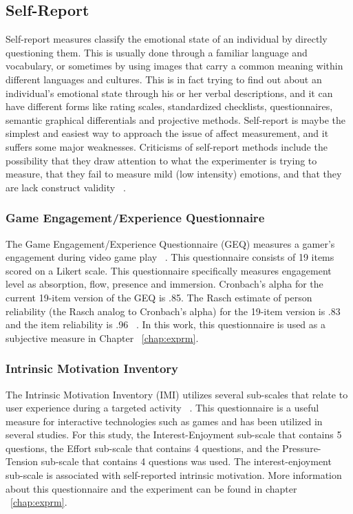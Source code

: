 \subsection{Self-Report}
Self-report measures classify the emotional state of an individual by directly questioning them. This is usually done through a familiar language and vocabulary, or sometimes by using images that carry a common meaning within different languages and cultures. This is in fact trying to find out about an individual's emotional state through his or her verbal descriptions, and it can have different forms like rating scales, standardized checklists, questionnaires, semantic graphical differentials and projective methods. Self-report is maybe the simplest and easiest way to approach the issue of affect measurement, and it suffers some major weaknesses. Criticisms of self-report methods include the possibility that they draw attention to what the experimenter is trying to measure, that they fail to measure mild (low intensity) emotions, and that they are lack construct validity ~\cite{isen2007some}.

\subsubsection{Game Engagement/Experience Questionnaire}
The Game Engagement/Experience Questionnaire (GEQ) measures a gamer's engagement during video game play ~\cite{brockmyer2009development}. This questionnaire consists of 19 items scored on a Likert scale. This questionnaire specifically measures engagement level as absorption, flow, presence and immersion. Cronbach's alpha for the current 19-item version of the GEQ is .85. The Rasch estimate of person reliability (the Rasch analog to Cronbach's alpha) for the 19-item version is .83 and the item reliability is .96 ~\cite{brockmyer2009development}. In this work, this questionnaire is used as a subjective measure in Chapter ~\ref{chap:exprm}.

\subsubsection{Intrinsic Motivation Inventory}
The Intrinsic Motivation Inventory (IMI) utilizes several sub-scales that relate to user experience during a targeted activity ~\cite{ryan1983relation}. This questionnaire is a useful measure for interactive technologies such as games and has been utilized in several studies. For this study, the Interest-Enjoyment sub-scale that contains 5 questions, the Effort sub-scale that contains 4 questions, and the Pressure-Tension sub-scale that contains 4 questions was used. The interest-enjoyment sub-scale is associated with self-reported intrinsic motivation. More information about this questionnaire and the experiment can be found in chapter ~\ref{chap:exprm}.

